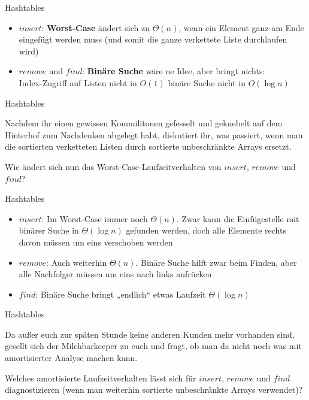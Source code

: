 \begin{frame}{Hashtables}
	\solutionheading
	
	\begin{itemize}
		\item $insert$: \textbf{Worst-Case} ändert sich zu $\Theta(n)$, wenn ein Element ganz am Ende eingefügt werden muss (und somit die ganze verkettete Liste durchlaufen wird)
		\item $remove$ und $find$: \textbf{Binäre Suche} wäre ne Idee, aber bringt nichts: \\
		Index-Zugriff auf Listen nicht in $O(1)$ \impl binäre Suche nicht in $O(\log n)$
	\end{itemize}
\end{frame}


\begin{frame}{Hashtables}
	
	Nachdem ihr einen gewissen Kommilitonen gefesselt und geknebelt auf dem Hinterhof zum Nachdenken abgelegt habt, diskutiert ihr, was passiert, wenn man die sortierten verketteten Listen durch sortierte unbeschränkte Arrays ersetzt.
	\medskip
	
	Wie ändert sich nun das Worst-Case-Laufzeitverhalten von $insert$, $remove$ und $find$?
\end{frame}

\begin{frame}{Hashtables}
	\solutionheading
	\begin{itemize}
		\item $insert$: Im Worst-Case immer noch $\Theta(n)$. Zwar kann die Einfügestelle mit binärer Suche in $\Theta( \log n)$ gefunden werden, doch alle Elemente rechts davon müssen um eins verschoben werden
		\pause
		\item $remove$: Auch weiterhin $\Theta(n)$. Binäre Suche hilft zwar beim Finden, aber alle Nachfolger müssen um eins nach links aufrücken
		\pause
		\item $find$: Binäre Suche bringt „endlich“ etwas \impl Laufzeit $\Theta( \log n)$
	\end{itemize}
\end{frame}


\begin{frame}{Hashtables}
	
	Da außer euch zur späten Stunde keine anderen Kunden mehr vorhanden sind, gesellt sich der Milchbarkeeper zu euch und fragt, ob man da nicht noch was mit amortisierter Analyse machen kann.
	\medskip
	
	Welches amortisierte Laufzeitverhalten lässt sich für $insert$, $remove$ und $find$ diagnostizieren (wenn man weiterhin sortierte unbeschränkte Arrays verwendet)?
\end{frame}

